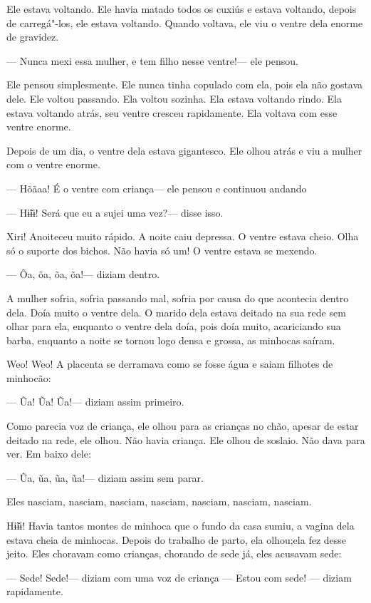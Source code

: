Ele estava voltando. Ele havia matado todos os cuxiús e estava voltando,
depois de carregá"-los, ele estava voltando. Quando voltava, ele viu o
ventre dela enorme de gravidez. 

--- Nunca mexi essa mulher, e tem filho nesse ventre!--- ele pensou. 

Ele pensou simplesmente. Ele nunca tinha copulado com ela, pois ela não
gostava dele. Ele voltou passando. Ela voltou sozinha. Ela estava
voltando rindo. Ela estava voltando atrás, seu ventre cresceu
rapidamente. Ela voltava com esse ventre enorme. 

Depois de um dia, o ventre dela estava gigantesco. Ele olhou atrás e viu
a mulher com o ventre enorme. 

--- Hõãaa! É o ventre com criança--- ele pensou e continuou andando 

--- Hɨ̃ɨɨ! Será que eu a sujei uma vez?--- disse isso.

Xiri! Anoiteceu muito rápido. A noite caiu depressa. O ventre estava
cheio. Olha só o suporte dos bichos. Não havia só um! O ventre estava se
mexendo. 

--- Õa, õa, õa, õa!--- diziam dentro. 

A mulher sofria, sofria passando mal, sofria por causa do que acontecia
dentro dela. Doía muito o ventre dela. O marido dela estava deitado na
sua rede sem olhar para ela, enquanto o ventre dela doía, pois doía
muito, acariciando sua barba, enquanto a noite se tornou logo densa e
grossa, as minhocas saíram.

Weo! Weo! A placenta se derramava como se fosse água e saiam filhotes de
minhocão:

--- Ũa! Ũa! Ũa!--- diziam assim primeiro. 

Como parecia voz de criança, ele olhou para as crianças no chão, apesar
de estar deitado na rede, ele olhou. Não havia criança. Ele olhou de
soslaio. Não dava para ver. Em baixo dele:

--- Ũa, ũa, ũa, ũa!--- diziam assim sem parar. 

Eles nasciam, nasciam, nasciam, nasciam, nasciam, nasciam, nasciam. 

Hɨ̃ɨɨ! Havia tantos montes de minhoca que o fundo da casa sumiu, a vagina
dela estava cheia de minhocas. Depois do trabalho de parto, ela
olhou;ela fez desse jeito. Eles choravam como crianças, chorando de sede
já, eles acusavam sede: 

--- Sede! Sede!--- diziam com uma voz de criança --- Estou com sede! ---
diziam rapidamente. 

